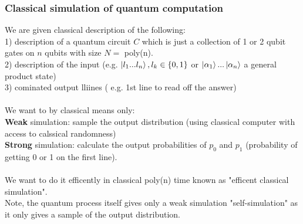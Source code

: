 \documentclass{article}
\begin{document}
                        \subsubsection{Classical simulation of quantum computation}
                        We are given classical description of the following:\\
                        1) description of a quantum circuit $C$ which is just a collection of 1 or 2 qubit gates on $n$ qubits with size $N =$ poly(n).\\
                        2) description of the input (e.g. $\ket{l_1...l_n}, l_k \in \{0,1\}$ or $\ket{\alpha_1} ... \ket{\alpha_n}$ a general product state)\\
                        3) cominated output lliines ( e.g. 1st line to read off the answer)\\\\
                        We want to by classical means only:\\
                        \textbf{Weak} simulation: sample the output distribution (using classical computer with access to calssical randomness)\\
                        \textbf{Strong} simulation: calculate the output probabilities of $p_0$ and $p_1$ (probability of getting 0 or 1 on the first line).\\\\
                        We want to do it efficently in classical poly(n) time known as "efficent classical simulation".\\
                        Note, the quantum process itself gives only a weak simulation "self-simulation" as it only gives a sample of the output distribution.\\
\end{document}
